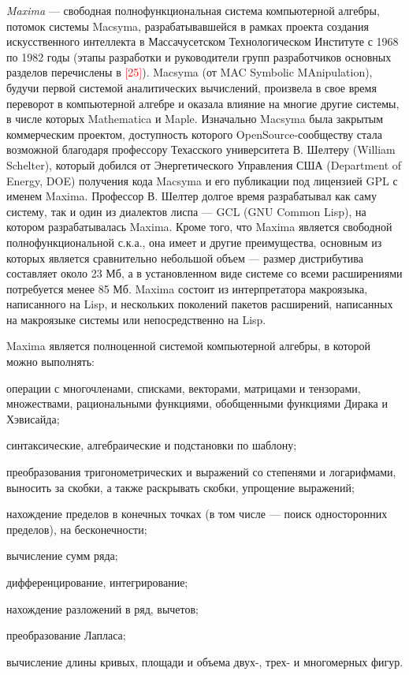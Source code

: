 \textit{Maxima} --- свободная полнофункциональная система компьютерной алгебры, потомок системы Macsyma, разрабатывавшейся в рамках проекта создания искусственного интеллекта в Массачусетском Технологическом Институте с 1968 по 1982 годы (этапы разработки и руководители групп разработчиков основных разделов перечислены в \textcolor{red}{[25]}). Macsyma (от MAC Symbolic MAnipulation), будучи первой системой аналитических вычислений, произвела в свое время переворот в компьютерной алгебре и оказала влияние на многие другие системы, в числе которых Mathematica и Maple. Изначально Macsyma была закрытым коммерческим проектом, доступность которого OpenSource-сообществу стала возможной благодаря профессору Техасского университета В. Шелтеру (William Schelter), который добился от Энергетического Управления США (Department of Energy, DOE) получения кода Macsyma и его публикации под лицензией GPL с именем Maxima. Профессор В. Шелтер долгое время разрабатывал как саму систему, так и один из диалектов лиспа --- GCL (GNU Common Lisp), на котором разрабатывалась Maxima.
Кроме того, что Maxima является свободной полнофункциональной с.к.а., она имеет и другие преимущества, основным из которых является сравнительно небольшой объем --- размер дистрибутива составляет около 23 Мб, а в установленном виде системе со всеми расширениями потребуется менее 85 Мб. Maxima состоит из интерпретатора макроязыка, написанного на Lisp, и нескольких поколений пакетов расширений, написанных на макроязыке системы или непосредственно на Lisp.

Maxima является полноценной системой компьютерной алгебры, в которой можно выполнять:
\begin{textitemize}
	\item операции с многочленами, списками, векторами, матрицами и тензорами, множествами, рациональными функциями, обобщенными функциями Дирака и Хэвисайда;
	\item синтаксические, алгебраические и подстановки по шаблону;
	\item преобразования тригонометрических и выражений со степенями и логарифмами, выносить за скобки, а также раскрывать скобки, упрощение выражений;
	\item нахождение пределов в конечных точках (в том числе --- поиск односторонних пределов), на бесконечности;
	\item вычисление сумм ряда;
	\item дифференцирование, интегрирование;
	\item нахождение разложений в ряд, вычетов;
	\item преобразование Лапласа;
	\item вычисление длины кривых, площади и объема двух-, трех- и многомерных фигур.
\end{textitemize}

